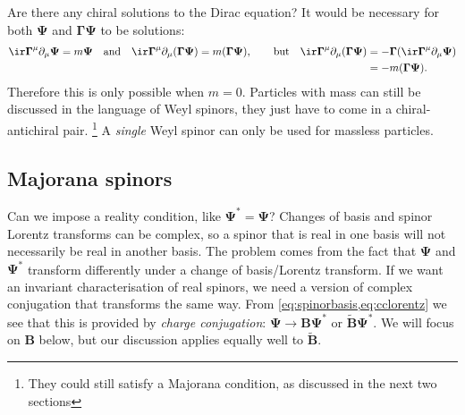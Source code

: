 \documentclass[11pt]{article}
\newcommand{\Gammab}{\boldsymbol{\Gamma}}
\newcommand{\B}{\mathbf{B}}
\newcommand{\Bt}{\widetilde{\B}}
\newcommand{\Psib}{\boldsymbol{\Psi}}
\begin{document}
Are there any chiral solutions to the Dirac equation?
It would be necessary for both $\Psib$ and $\Gammab \Psib$ to be solutions:
%
\begin{equation*}
  \ir \Gammab^\mu \partial_\mu \Psib = m \Psib
  \quad \text{and} \quad
  \ir \Gammab^\mu \partial_\mu (\Gammab \Psib) = m (\Gammab \Psib),
  \qquad \text{but} \quad
\begin{aligned}[t]
  \ir \Gammab^\mu \partial_\mu (\Gammab \Psib)
    &= - \Gammab (\ir \Gammab^\mu \partial_\mu \Psib) \\
    &= - m (\Gammab \Psib).
\end{aligned}
\end{equation*}
%
Therefore this is only possible when $m=0$.
Particles with mass can still be discussed in the language of Weyl spinors, they just have to come in a chiral-antichiral pair.%
\footnote{They could still satisfy a Majorana condition, as discussed in the next two sections}
A \emph{single} Weyl spinor can only be used for massless particles.


\subsection{Majorana spinors}\label{sec:majorana}

Can we impose a reality condition, like $\Psib^\ast = \Psib$?
Changes of basis and spinor Lorentz transforms can be complex, so a spinor that is real in one basis will not necessarily be real in another basis.
The problem comes from the fact that $\Psib$ and $\Psib^\ast$ transform differently under a change of basis/Lorentz transform.
If we want an invariant characterisation of real spinors, we need a version of complex conjugation that transforms the same way.
From \cref{eq:spinorbasis,eq:cclorentz} we see that this is provided by \emph{charge conjugation}: \( \Psib \to \B \Psib^\ast \) or \( \Bt \Psib^\ast \).
We will focus on $\B$ below, but our discussion applies equally well to $\Bt$.
\end{document}
